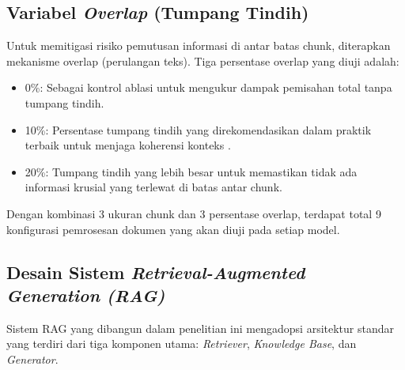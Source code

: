 \subsection{Variabel \textit{Overlap} (Tumpang Tindih)}
Untuk memitigasi risiko pemutusan informasi di antar batas chunk, diterapkan mekanisme overlap (perulangan teks). Tiga persentase overlap yang diuji adalah: 

\begin{itemize}
     \item 0\%: Sebagai kontrol ablasi untuk mengukur dampak pemisahan total tanpa tumpang tindih.
     \item 10\%: Persentase tumpang tindih yang direkomendasikan dalam praktik terbaik untuk menjaga koherensi konteks \citep{weaviate2024chunking}.
     \item 20\%: Tumpang tindih yang lebih besar untuk memastikan tidak ada informasi krusial yang terlewat di batas antar chunk.
\end{itemize}

Dengan kombinasi 3 ukuran chunk dan 3 persentase overlap, terdapat total 9 konfigurasi pemrosesan dokumen yang akan diuji pada setiap model. 

\subsection{Desain Sistem \textit{Retrieval-Augmented Generation (RAG)}} 

Sistem RAG yang dibangun dalam penelitian ini mengadopsi arsitektur standar yang terdiri dari tiga komponen utama: \textit{Retriever}, \textit{Knowledge Base}, dan \textit{Generator}. 

